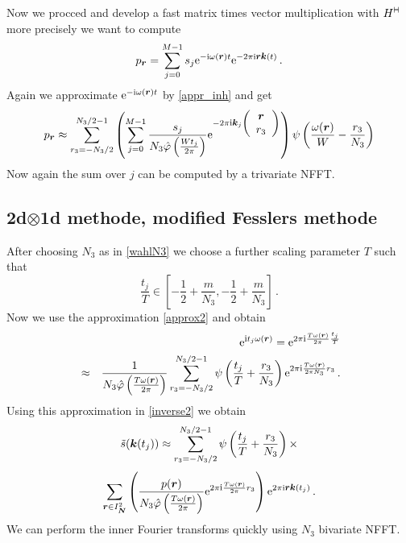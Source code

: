 \documentclass[journal]{IEEEtran}
\def\ti{\mbox{\scriptsize{\rm i}}}
\newcommand{\eip}[1]{{\rm e}^{ 2\pi{\ti} #1}}
\newcommand{\eim}[1]{{\rm e}^{-2\pi{\ti} #1}}
\newcommand{\zb}[1]{\mbox{\boldmath{${#1}$}}}
\newcommand{\zbs}[1]{\mbox{\boldmath\scriptsize{${#1}$}}}
\newcommand{\zbss}[1]{\mbox{\boldmath\tiny{${#1}$}}}
\newcommand{\adj}{{\vdash \hspace*{-1.72mm} \dashv}}
\numberwithin{equation}{section}
\numberwithin{table}{section}
\numberwithin{figure}{section}
\begin{document}
Now we procced and develop a fast matrix times vector
multiplication with $H^{\adj}$ more precisely we want to compute
\[
p_{\zbs r} =
\sum_{j=0}^{M-1} s_j 
{\rm e}^{-{\rm\scriptsize i}\omega(\zbs r)t}
{\rm e}^{-2\pi {\rm\scriptsize i}\zbs r \zbs k(t)}\, .
\]
Again we approximate ${\rm e}^{-{\rm\scriptsize i}\omega(\zbs r)t}$ by
\eqref{appr_inh} and get
\[
p_{\zbs r} \approx
\sum_{r_3=-N_3/2}^{N_3/2-1}\left(
\sum_{j=0}^{M-1} \frac{s_j}{N_3 \hat\varphi\left(\frac{Wt_j}{2\pi}\right)}
 \eim{\zbs k_j
\left(\begin{array}{c}
\zb r\\
r_3
\end{array}\right)}\right)
\psi \left(\frac{\omega(\zb r)}{W}-\frac{r_3}{N_3}\right)
\]
Now again the sum over $j$ can be computed by a trivariate NFFT.

\subsection{2d$\otimes$1d methode, modified Fesslers methode}

After choosing $N_3$ as in \eqref{wahlN3} we choose a further scaling parameter $T$ such that
\[
\frac{t_j}{T}
\in[-\frac{1}{2}+\frac{m}{N_3},-\frac{1}{2}+\frac{m}{N_3}]\, . 
\]
Now we use the approximation \eqref{approx2} and obtain
\begin{eqnarray*}
&&{\rm e}^{\ti t_j \omega(\zbs r)} = 
\eip{\frac{T\omega(\zbss r)}{2\pi}\frac{t_j}{T}}\\ \nonumber
&\approx&
\frac{1}{N_3\hat\varphi\left(\frac{T\omega(\zbs r)}{2\pi}\right)}
\sum_{r_3=-N_3/2}^{N_3/2-1} 
\psi\left(\frac{t_j}{T}+\frac{r_3}{N_3}\right)  
\eip{\frac{T\omega(\zbss r)}{2\pi N_3}r_3}\, .
\end{eqnarray*}
Using this approximation in \eqref{inverse2} we obtain
\begin{equation*}
\tilde s(\zb k(t_j)) \approx
\sum_{r_3=-N_3/2}^{N_3/2-1}
\psi\left(\frac{t_j}{T}+\frac{r_3}{N_3}\right) \times
\end{equation*}
\begin{equation*}
\sum_{\zbs r \in I^2_{\zbss N}} 
\left(
\frac{p(\zb r)}{N_3\hat\varphi\left(\frac{T\omega(\zbs
      r)}{2\pi}\right)}
\eip{\frac{T\omega(\zbss r)}{2\pi}r_3}
\right)
{\rm e}^{2\pi {\rm\scriptsize i}\zbs r \zbs k(t_j)}\, .
\end{equation*}
We can perform the inner Fourier transforms quickly using $N_3$
bivariate NFFT.


\end{document}
